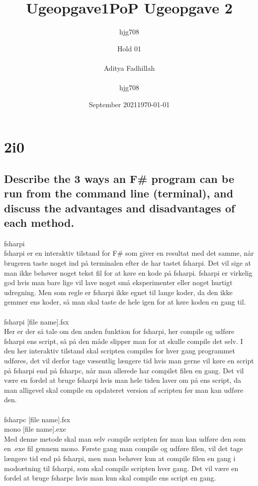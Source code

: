\documentclass{article}
\title{Ugeopgave1}
\author{hjg708}
\date{September 2021}
\begin{document}
\begin{titlepage}
\title{PoP Ugeopgave 2}
\author{Hold 01 \\\\ Aditya Fadhillah \\\\ hjg708}
\date{\today}
\maketitle
\thispagestyle{empty}   
\end{titlepage}



\section*{2i0}
\subsection*{Describe the 3 ways an F\# program can be run from the command line (terminal), and discuss the advantages and disadvantages of each method.}
fsharpi \\
fsharpi er en interaktiv tilstand for F\# som giver en resultat med det samme, når brugeren taste noget ind på terminalen efter de har tastet fsharpi. Det vil sige at man ikke behøver noget tekst fil for at køre en kode på fsharpi. fsharpi er virkelig god hvis man bare lige vil lave noget små eksperimenter eller noget hurtigt udregning. Men som regle er fsharpi ikke egnet til lange koder, da den ikke gemmer ens koder, så man skal taste de hele igen for at køre koden en gang til.\\
\\
fsharpi [file name].fsx \\
Her er der så tale om den anden funktion for fsharpi, her compile og udføre fsharpi ens script, så på den måde slipper man for at skulle compile det selv. I den her interaktiv tilstand skal scripten compiles for hver gang programmet udføres, det vil derfor tage væsentlig længere tid hvis man gerne vil køre en script på fsharpi end på fsharpc, når man allerede har compilet filen en gang. Det vil være en fordel at bruge fsharpi hvis man hele tiden laver om på ens script, da man alligevel skal compile en opdateret version af scripten før man kan udføre den. \\
\\
fsharpc [file name].fsx 
\\
mono [file name].exe 
\\
Med denne metode skal man selv compile scripten før man kan udføre den som en .exe fil gennem mono. Første gang man compile og udføre filen, vil det tage længere tid end på fsharpi, men man behøver kun at compile filen en gang i modsætning til fsharpi, som skal compile scripten hver gang. Det vil være en fordel at bruge fsharpc hvis man kun skal compile ens script en gang. \\
\end{document}
